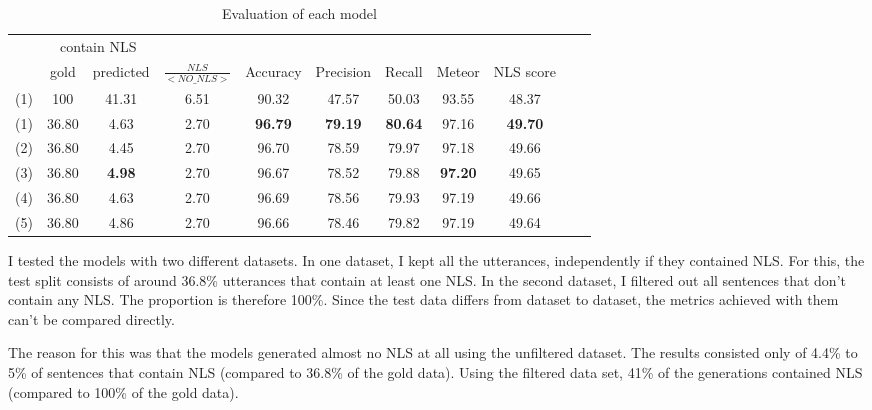 \documentclass[
	11pt, %
]{fphw}
\begin{document}
\begin{table}[h]
    \centering
    \begin{tabular}{c || c c | c | c c c c c c c}
            & \multicolumn{2}{c|}{contain NLS} &               &                         &                &                &                &                &                & \\
            & gold                             & predicted     & $\frac{NLS}{<NO\_NLS>}$ & Accuracy       & Precision      & Recall         & Meteor         & NLS score        \\
        \hline
        (1) & 100                              & 41.31         & 6.51                    & 90.32          & 47.57          & 50.03          & 93.55          & 48.37            \\
        (1) & 36.80                            & 4.63          & 2.70                    & \textbf{96.79} & \textbf{79.19} & \textbf{80.64} & 97.16          & \textbf{49.70}   \\
        (2) & 36.80                            & 4.45          & 2.70                    & 96.70          & 78.59          & 79.97          & 97.18          & 49.66            \\
        (3) & 36.80                            & \textbf{4.98} & 2.70                    & 96.67          & 78.52          & 79.88          & \textbf{97.20} & 49.65            \\
        (4) & 36.80                            & 4.63          & 2.70                    & 96.69          & 78.56          & 79.93          & 97.19          & 49.66            \\
        (5) & 36.80                            & 4.86          & 2.70                    & 96.66          & 78.46          & 79.82          & 97.19          & 49.64
    \end{tabular}
    \caption{Evaluation of each model}
\end{table}

I tested the models with two different datasets. In one dataset, I kept all the utterances, independently if they contained NLS. For this, the test split consists of around 36.8\% utterances that contain at least one NLS. In the second dataset, I filtered out all sentences that don't contain any NLS. The proportion is therefore 100\%.
Since the test data differs from dataset to dataset, the metrics achieved with them can't be compared directly.

The reason for this was that the models generated almost no NLS at all using the unfiltered dataset. The results consisted only of 4.4\% to 5\% of sentences that contain NLS (compared to 36.8\% of the gold data). Using the filtered data set, 41\% of the generations contained NLS (compared to 100\% of the gold data).
\end{document}
